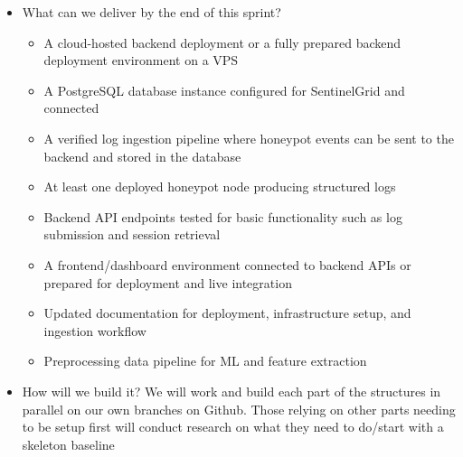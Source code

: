 \documentclass{article}
\begin{document}
\begin{itemize}
    \item What can we deliver by the end of this sprint? 
    \begin{itemize}
        \item A cloud-hosted backend deployment or a fully prepared backend deployment environment on a VPS
        \item A PostgreSQL database instance configured for SentinelGrid and connected
        \item A verified log ingestion pipeline where honeypot events can be sent to the backend and stored in the database
        \item At least one deployed honeypot node producing structured logs
        \item Backend API endpoints tested for basic functionality such as log submission and session retrieval
        \item A frontend/dashboard environment connected to backend APIs or prepared for deployment and live integration
        \item Updated documentation for deployment, infrastructure setup, and ingestion workflow
        \item Preprocessing data pipeline for ML and feature extraction 
    \end{itemize}
    
    \item How will we build it? 
      We will work and build each part of the structures in parallel on our own branches on Github. Those relying on other parts needing to be setup first will conduct research on what they need to do/start with a skeleton baseline 


\end{itemize}
\end{document}
